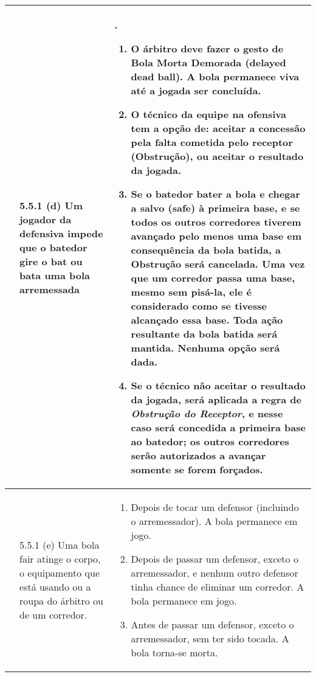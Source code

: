 {\footnotesize
	\begin{tabular}{p{}p{}|p{}}
		
		
		& 5.5.1 (d) Um jogador da defensiva impede que o batedor gire o \gls{bat} ou bata uma bola arremessada&. 
		
		
		\begin{enumerate}[label=\arabic*)]
			\item O \'arbitro deve fazer o gesto de Bola Morta Demorada (\gls{delayed dead ball}). A bola permanece viva at\'e a jogada ser conclu\'ida. 
			
			\item  O t\'ecnico da equipe na ofensiva tem a op\c{c}\~ao de: aceitar a concess\~ao pela falta cometida pelo receptor (Obstru\c{c}\~ao), ou aceitar o resultado da jogada. 
			
			\item  Se o batedor bater a bola e chegar a salvo (\gls{safe}) \`a primeira base, e se todos os outros corredores tiverem avan\c{c}ado pelo menos uma base em consequ\^encia da bola batida, a Obstru\c{c}\~ao ser\'a cancelada. Uma vez que um corredor passa uma base, mesmo sem pis\'a-la, ele \'e considerado como se tivesse alcan\c{c}ado essa base. Toda a\c{c}\~ao resultante da bola batida ser\'a mantida. Nenhuma op\c{c}\~ao ser\'a dada. 
			
			\item Se o t\'ecnico n\~ao aceitar o resultado da jogada, ser\'a aplicada a regra de \textsl{Obstru\c{c}\~ao do Receptor}, e nesse caso ser\'a concedida a primeira base ao batedor; os outros corredores ser\~ao autorizados a avan\c{c}ar somente se forem for\c{c}ados. 
		\end{enumerate}
		\\\hline
		& 5.5.1 (e) Uma bola \gls{fair} atinge o corpo, o equipamento que est\'a usando ou a roupa do \'arbitro ou de um corredor. &
		\begin{enumerate}[label=\arabic*)]
			\item Depois de tocar um defensor (incluindo o arremessador). A bola permanece em jogo. 
			\item Depois de passar um defensor, exceto o arremessador, e nenhum outro defensor tinha chance de eliminar um corredor. A bola permanece em jogo. 
			\item Antes de passar um defensor, exceto o arremessador, sem ter sido tocada. A bola torna-se morta. 
		\end{enumerate}\\\hline
\end{tabular}}

